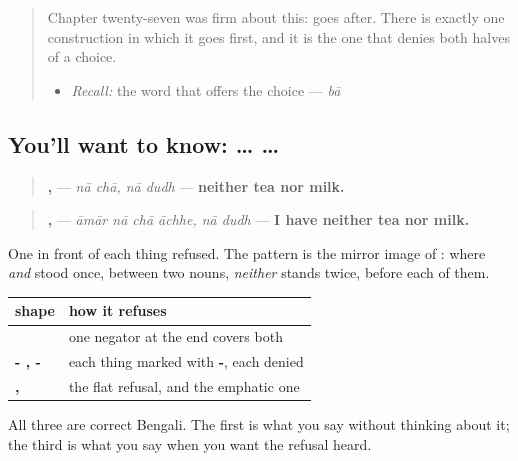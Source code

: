 \label{lesson:BN-C17-na-na}



\begin{quote}
Chapter twenty-seven was firm about this: \textbf{} goes after. There is exactly one construction in which it goes first, and it is the one that denies both halves of a choice.

\begin{itemize}
\raggedright
  \item \emph{Recall:} the word that offers the choice — \emph{bā}
\end{itemize}
\end{quote}

\subsection*{You'll want to know:  …  …}
\begin{quote}
\textbf{ ,  } — \emph{nā chā, nā dudh} — \textbf{neither tea nor milk.}
\end{quote}

\begin{quote}
\textbf{   ,  } — \emph{āmār nā chā āchhe, nā dudh} — \textbf{I have neither tea nor milk.}
\end{quote}

One \textbf{} in front of each thing refused. The pattern is the mirror image of \textbf{}: where \emph{and} stood once, between two nouns, \emph{neither} stands twice, before each of them.

\begin{grammarlens}[title={Grammar Lens: three ways to refuse two things}]
\noindent
\begin{tabularx}{\linewidth}{@{}>{\raggedright\arraybackslash}X>{\raggedright\arraybackslash}X@{}}
\toprule
\textbf{shape} & \textbf{how it refuses} \\
\midrule
\textbf{\bn{আমার} \bn{চা} \bn{আর} \bn{দুধ} \bn{নেই}} & one negator at the end covers both \\
\textbf{\bn{চা}-\bn{ও} \bn{নেই}, \bn{দুধ}-\bn{ও} \bn{নেই}} & each thing marked with \textbf{-\bn{ও}}, each denied \\
\textbf{\bn{না} \bn{চা}, \bn{না} \bn{দুধ}} & the flat refusal, and the emphatic one \\
\bottomrule
\end{tabularx}

All three are correct Bengali. The first is what you say without thinking about it; the third is what you say when you want the refusal heard.
\end{grammarlens}


